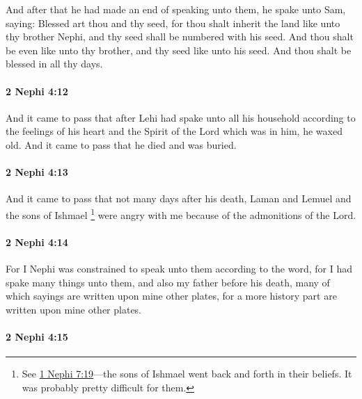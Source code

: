 			And after that he had made an end of speaking unto them,
			he spake unto Sam, saying:
			Blessed art thou and thy seed,
			for thou shalt inherit the land like unto thy brother Nephi,
			and thy seed shall be numbered with his seed.
			And thou shalt be even like unto thy brother,
			and thy seed like unto his seed.
			And thou shalt be blessed in all thy days.

		\paragraph{2 Nephi 4:12} %
			\label{2NEPHI-4-12}

			And it came to pass that
			after Lehi had spake unto all his household
			according to the feelings of his heart
			and the Spirit of the Lord which was in him,
			he waxed old.
			And it came to pass that he died and was buried.

		\paragraph{2 Nephi 4:13} %
			\label{2NEPHI-4-13}

			And it came to pass that not many days after his death,
			Laman and Lemuel and the sons of Ishmael%
				\footnote{%
					\label{2NEPHI-4-13-sons-ishmael}%
					See \hyperref[1NEPHI-7-19]{1 Nephi 7:19}---the sons of Ishmael went back and forth in their beliefs. It was probably pretty difficult for them.
					}
			were angry with me
			because of the admonitions of the Lord.

		\paragraph{2 Nephi 4:14} %
			\label{2NEPHI-4-14}

			For I Nephi was constrained to speak unto them according to the word,
			for I had spake many things unto them,
			and also my father before his death,
			many of which sayings are written upon mine other plates,
			for a more history part are written upon mine other plates.

		\paragraph{2 Nephi 4:15} %
			\label{2NEPHI-4-15}


